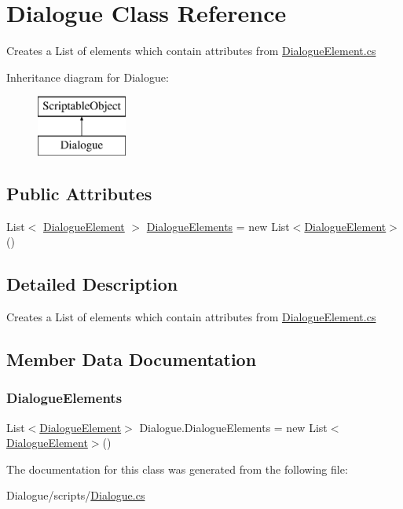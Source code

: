 \hypertarget{class_dialogue}{}\section{Dialogue Class Reference}
\label{class_dialogue}


Creates a List of elements which contain attributes from \mbox{\hyperlink{_dialogue_element_8cs}{Dialogue\+Element.\+cs}}  


Inheritance diagram for Dialogue\+:\begin{figure}[H]
\begin{center}
\leavevmode
\includegraphics[height=2.000000cm]{class_dialogue}
\end{center}
\end{figure}
\subsection*{Public Attributes}
\begin{DoxyCompactItemize}
\item 
List$<$ \mbox{\hyperlink{class_dialogue_element}{Dialogue\+Element}} $>$ \mbox{\hyperlink{class_dialogue_ae24b80e9ccce4796c937901ba0db94c4}{Dialogue\+Elements}} = new List$<$\mbox{\hyperlink{class_dialogue_element}{Dialogue\+Element}}$>$()
\end{DoxyCompactItemize}


\subsection{Detailed Description}
Creates a List of elements which contain attributes from \mbox{\hyperlink{_dialogue_element_8cs}{Dialogue\+Element.\+cs}} 



\subsection{Member Data Documentation}
\mbox{\label{class_dialogue_ae24b80e9ccce4796c937901ba0db94c4}} 
\subsubsection{\texorpdfstring{Dialogue\+Elements}{DialogueElements}}
{\footnotesize\ttfamily List$<$\mbox{\hyperlink{class_dialogue_element}{Dialogue\+Element}}$>$ Dialogue.\+Dialogue\+Elements = new List$<$\mbox{\hyperlink{class_dialogue_element}{Dialogue\+Element}}$>$()}



The documentation for this class was generated from the following file\+:\begin{DoxyCompactItemize}
\item 
Dialogue/scripts/\mbox{\hyperlink{_dialogue_8cs}{Dialogue.\+cs}}\end{DoxyCompactItemize}
